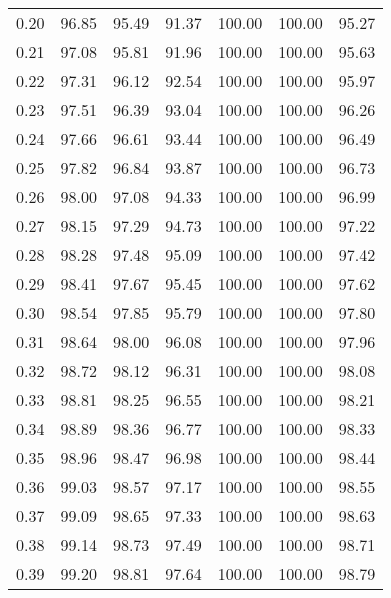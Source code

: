 \begin{tabular}{|c|c|c|c|c|c|c|}
      0.20 &     96.85 &     95.49 &      91.37 &  100.00 &     100.00 &         95.27 \\
      0.21 &     97.08 &     95.81 &      91.96 &  100.00 &     100.00 &         95.63 \\
      0.22 &     97.31 &     96.12 &      92.54 &  100.00 &     100.00 &         95.97 \\
      0.23 &     97.51 &     96.39 &      93.04 &  100.00 &     100.00 &         96.26 \\
      0.24 &     97.66 &     96.61 &      93.44 &  100.00 &     100.00 &         96.49 \\
      0.25 &     97.82 &     96.84 &      93.87 &  100.00 &     100.00 &         96.73 \\
      0.26 &     98.00 &     97.08 &      94.33 &  100.00 &     100.00 &         96.99 \\
      0.27 &     98.15 &     97.29 &      94.73 &  100.00 &     100.00 &         97.22 \\
      0.28 &     98.28 &     97.48 &      95.09 &  100.00 &     100.00 &         97.42 \\
      0.29 &     98.41 &     97.67 &      95.45 &  100.00 &     100.00 &         97.62 \\
      0.30 &     98.54 &     97.85 &      95.79 &  100.00 &     100.00 &         97.80 \\
      0.31 &     98.64 &     98.00 &      96.08 &  100.00 &     100.00 &         97.96 \\
      0.32 &     98.72 &     98.12 &      96.31 &  100.00 &     100.00 &         98.08 \\
      0.33 &     98.81 &     98.25 &      96.55 &  100.00 &     100.00 &         98.21 \\
      0.34 &     98.89 &     98.36 &      96.77 &  100.00 &     100.00 &         98.33 \\
      0.35 &     98.96 &     98.47 &      96.98 &  100.00 &     100.00 &         98.44 \\
      0.36 &     99.03 &     98.57 &      97.17 &  100.00 &     100.00 &         98.55 \\
      0.37 &     99.09 &     98.65 &      97.33 &  100.00 &     100.00 &         98.63 \\
      0.38 &     99.14 &     98.73 &      97.49 &  100.00 &     100.00 &         98.71 \\
      0.39 &     99.20 &     98.81 &      97.64 &  100.00 &     100.00 &         98.79 \\

\end{tabular}
